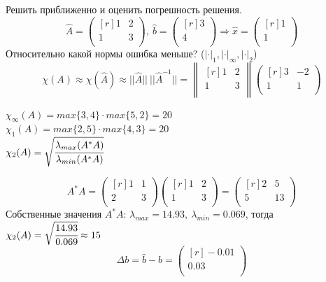 \documentclass[12pt]{article}
\theoremstyle{definition}
\numberwithin{equation}{section}
\begin{document}
Решить приближенно и оценить погрешность решения.\\
\[\hat A=\begin{pmatrix}[r]
1 & 2 \\
1 & 3 \\
\end{pmatrix},~\hat b= \begin{pmatrix}[r]
3 \\
4 \\
\end{pmatrix} \Rightarrow \hat x = \begin{pmatrix}[r]
1 \\
1 \\
\end{pmatrix}\]
Относительно какой нормы ошибка меньше? ($|\cdot|_1, |\cdot|_{\infty}, |\cdot|_2$)\\
\[\chi(A)\approx \chi(\hat A)\approx ||\hat A||~||\hat A^{-1}||=\begin{Vmatrix}[r]
1 & 2 \\
1 & 3 \\
\end{Vmatrix} \begin{pmatrix}[r]
3 & -2 \\
1 & 1 \\
\end{pmatrix}\]
\begin{center}
$\chi_{\infty}(A)=max\{3, 4\}\cdot max\{5, 2\}=20$\\
$\chi_1(A)=max\{2, 5\}\cdot max\{4, 3\}=20$\\
$\chi_2(A)=\sqrt{\cfrac{\lambda_{max}(A^*A)}{\lambda_{min}(A^*A)}}$
\end{center}
\[A^*A=\begin{pmatrix}[r]
1 & 1 \\
2 & 3 \\
\end{pmatrix} \begin{pmatrix}[r]
1 & 2 \\
1 & 3 \\
\end{pmatrix} = \begin{pmatrix}[r]
2 & 5 \\
5 & 13 \\
\end{pmatrix}\]
Собственные значения $A^*A$: $\lambda_{max}=14.93,~ \lambda_{min}=0.069$, тогда $\chi_2(A)=\sqrt{\cfrac{14.93}{0.069}}\approx 15$
\[\Delta b=\hat b-b =\begin{pmatrix}[r]
-0.01 \\
0.03 \\
\end{pmatrix}\]
\end{document}

